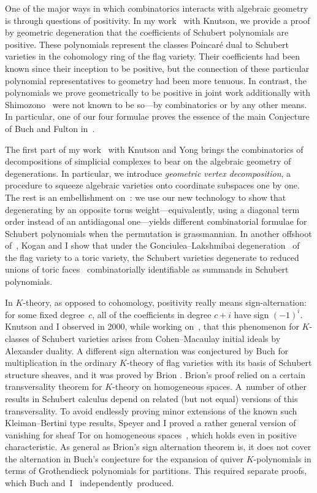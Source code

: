 \documentclass[11pt]{proposal}
\begin{document}
One of the major ways in which combinatorics interacts with algebraic
geometry is through questions of positivity.  In my
work~\cite{grobGeom} with Knutson, we provide a proof by geometric
degeneration that the coefficients of Schubert polynomials are
positive.  These polynomials represent the classes Poincar\'e dual to
Schubert varieties in the cohomology ring of the flag variety.  Their
coefficients had been known since their inception \cite{LSpolySchub}
to be positive, but the connection of these particular polynomial
representatives to geometry had been more tenuous.  In contrast, the
polynomials we prove geometrically to be positive in joint work
additionally with Shimozono~\cite{quivers} were not known to be
so---by combinatorics or by any other means.  In particular, one of
our four formulae proves the essence of the main Conjecture of Buch
and Fulton in~\cite{BF99}.

The first part of my work~\cite{flagTab} with Knutson and Yong brings
the combinatorics of decompositions of simplicial complexes to bear on
the algebraic geometry of degenerations.  In particular, we introduce
\emph{geometric vertex decomposition}, a procedure to squeeze
algebraic varieties onto coordinate subspaces one by one.  The rest is
an embellishment on~\cite{grobGeom}: we use our new technology to show
that degenerating by an opposite torus weight---equivalently, using a
diagonal term order instead of an antidiagonal one---yields different
combinatorial formulae for Schubert polynomials when the permutation
is grassmannian.  In another offshoot of~\cite{grobGeom}, Kogan and I
show that under the Gonciulea--Lakshmibai degeneration~\cite{GL96} of
the flag variety to a toric variety, the Schubert varieties degenerate
to reduced unions of toric faces~\cite{deform} combinatorially
identifiable as summands in Schubert polynomials.

In $K$-theory, as opposed to cohomology, positivity really means
sign-alternation: for some fixed degree~$c$, all of the coefficients
in degree $c+i$ have sign $(-1)^i$.  Knutson and I observed in 2000,
while working on~\cite{grobGeom}, that this phenomenon for $K$-classes
of Schubert varieties arises from Cohen--Macaulay initial ideals by
Alexander duality.  A different sign alternation was conjectured by
Buch \cite{buchLR} for multiplication in the ordinary $K$-theory of
flag varieties with its basis of Schubert structure sheaves, and it
was proved by Brion \cite{brion02}.  Brion's proof relied on a certain
transversality theorem for $K$-theory on homogeneous spaces.  A~number
of other results in Schubert calculus depend on related (but not
equal) versions of this transversality.  To avoid endlessly proving
minor extensions of the known such Kleiman--Bertini type results,
Speyer and I proved a rather general version of vanishing for sheaf
Tor on homogeneous spaces~\cite{torVanish}, which holds even in
positive characteristic.  As general as Brion's sign alternation
theorem is, it does not cover the alternation in Buch's conjecture
\cite{buch02} for the expansion of quiver $K$-polynomials in terms of
Grothen\-dieck polynomials for partitions.  This required separate
proofs, which Buch \cite{buchAlt} and~I~\cite{kquiv}
\mbox{independently produced}.
\end{document}
